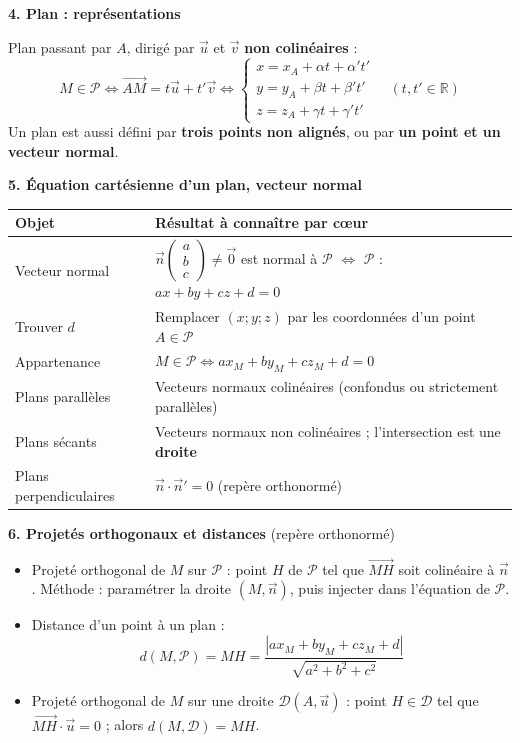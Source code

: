 \documentclass[11pt]{article}
\newcommand{\cle}[1]{{\popxbold\color{popdark}#1}}
\begin{document}
\begin{bilan}
\textbf{4. Plan : représentations}

Plan passant par $A$, dirigé par $\vec{u}$ et $\vec{v}$ \textbf{non colinéaires} :
\[ M\in\mathcal{P} \iff \overrightarrow{AM}=t\vec{u}+t'\vec{v} \iff \begin{cases} x=x_A+\alpha t+\alpha' t' \\ y=y_A+\beta t+\beta' t' \\ z=z_A+\gamma t+\gamma' t' \end{cases} \quad (t,t'\in\mathbb{R}) \]
Un plan est aussi défini par \textbf{trois points non alignés}, ou par \textbf{un point et un vecteur normal}.

\textbf{5. Équation cartésienne d'un plan, vecteur normal}
\begin{center}
\begin{tabularx}{\linewidth}{|l|X|}
\hline
\rowcolor{popblueL} \textbf{Objet} & \textbf{Résultat à connaître par c\oe ur} \\
\hline
Vecteur normal & $\vec{n}\begin{pmatrix} a \\ b \\ c \end{pmatrix}\neq\vec{0}$ est normal à $\mathcal{P}$ $\iff$ $\mathcal{P}$ : $ax+by+cz+d=0$ \\
\hline
Trouver $d$ & Remplacer $(x;y;z)$ par les coordonnées d'un point $A\in\mathcal{P}$ \\
\hline
Appartenance & $M\in\mathcal{P} \iff ax_M+by_M+cz_M+d=0$ \\
\hline
Plans parallèles & Vecteurs normaux colinéaires (confondus ou strictement parallèles) \\
\hline
Plans sécants & Vecteurs normaux non colinéaires ; l'intersection est une \textbf{droite} \\
\hline
Plans perpendiculaires & $\vec{n}\cdot\vec{n}'=0$ (repère orthonormé) \\
\hline
\end{tabularx}
\end{center}

\textbf{6. Projetés orthogonaux et distances} (repère orthonormé)
\begin{itemize}
  \item \cle{Projeté orthogonal} de $M$ sur $\mathcal{P}$ : point $H$ de $\mathcal{P}$ tel que $\overrightarrow{MH}$ soit colinéaire à $\vec{n}$. Méthode : paramétrer la droite $(M,\vec{n})$, puis injecter dans l'équation de $\mathcal{P}$.
  \item Distance d'un point à un plan :
  \[ d(M,\mathcal{P})=MH=\dfrac{|ax_M+by_M+cz_M+d|}{\sqrt{a^2+b^2+c^2}} \]
  \item Projeté orthogonal de $M$ sur une droite $\mathcal{D}(A,\vec{u})$ : point $H\in\mathcal{D}$ tel que $\overrightarrow{MH}\cdot\vec{u}=0$ ; alors $d(M,\mathcal{D})=MH$.
\end{itemize}


\end{bilan}
\end{document}
